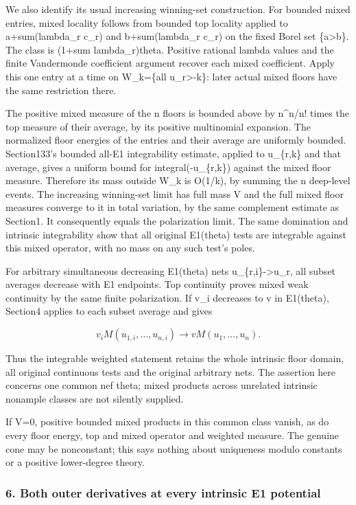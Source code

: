 \documentclass[
  10pt,
]{article}
\begin{document}
We also identify its usual increasing winning-set construction. For
bounded mixed entries, mixed locality follows from bounded top locality
applied to a+sum(lambda\_r c\_r) and b+sum(lambda\_r c\_r) on the fixed
Borel set \{a\textgreater b\}. The class is (1+sum lambda\_r)theta.
Positive rational lambda values and the finite Vandermonde coefficient
argument recover each mixed coefficient. Apply this one entry at a time
on W\_k=\{all u\_r\textgreater-k\}: later actual mixed floors have the
same restriction there.

The positive mixed measure of the n floors is bounded above by n\^{}n/n!
times the top measure of their average, by its positive multinomial
expansion. The normalized floor energies of the entries and their
average are uniformly bounded. Section133's bounded all-E1 integrability
estimate, applied to u\_\{r,k\} and that average, gives a uniform bound
for integral(-u\_\{r,k\}) against the mixed floor measure. Therefore its
mass outside W\_k is O(1/k), by summing the n deep-level events. The
increasing winning-set limit has full mass V and the full mixed floor
measures converge to it in total variation, by the same complement
estimate as Section1. It consequently equals the polarization limit. The
same domination and intrinsic integrability show that all original
E1(theta) tests are integrable against this mixed operator, with no mass
on any such test's poles.

For arbitrary simultaneous decreasing E1(theta) nets
u\_\{r,i\}-\textgreater u\_r, all subset averages decrease with E1
endpoints. Top continuity proves mixed weak continuity by the same
finite polarization. If v\_i decreases to v in E1(theta), Section4
applies to each subset average and gives

\[v_i M(u_{1,i},\ldots,u_{n,i})
\longrightarrow vM(u_1,\ldots,u_n).\]

Thus the integrable weighted statement retains the whole intrinsic floor
domain, all original continuous tests and the original arbitrary nets.
The assertion here concerns one common nef theta; mixed products across
unrelated intrinsic nonample classes are not silently supplied.

If V=0, positive bounded mixed products in this common class vanish, as
do every floor energy, top and mixed operator and weighted measure. The
genuine cone may be nonconstant; this says nothing about uniqueness
modulo constants or a positive lower-degree theory.

\subsubsection{6. Both outer derivatives at every intrinsic E1
potential}\label{both-outer-derivatives-at-every-intrinsic-e1-potential}
\end{document}
